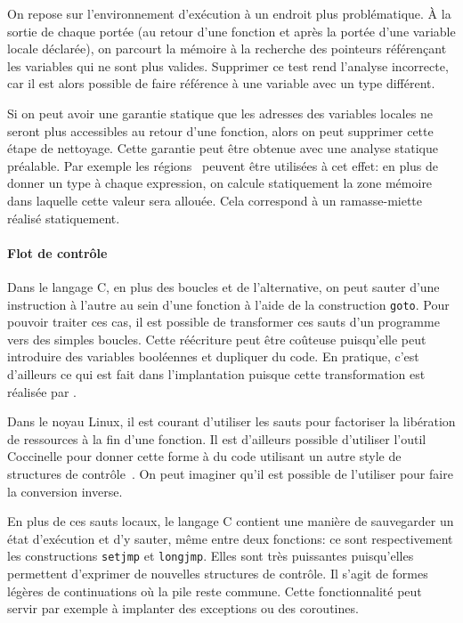 On repose sur l'environnement d'exécution à un endroit plus problématique. À la
sortie de chaque portée (au retour d'une fonction et après la portée d'une
variable locale déclarée), on parcourt la mémoire à la recherche des pointeurs
référençant les variables qui ne sont plus valides. Supprimer ce test rend
l'analyse incorrecte, car il est alors possible de faire référence à une
variable avec un type différent.

Si on peut avoir une garantie statique que les adresses des variables locales ne
seront plus accessibles au retour d'une fonction, alors on peut supprimer cette
étape de nettoyage. Cette garantie peut être obtenue avec une analyse statique
préalable. Par exemple les régions~\cite{jfp92} peuvent être utilisées à cet
effet: en plus de donner un type à chaque expression, on calcule
statiquement la zone mémoire dans laquelle cette valeur sera allouée. Cela
correspond à un ramasse-miette réalisé statiquement.


\paragraph{Flot de contrôle}

Dans le langage C, en plus des boucles et de l'alternative, on peut sauter d'une
instruction à l'autre au sein d'une fonction à l'aide de la construction
\texttt{goto}. Pour pouvoir traiter ces cas, il est possible de transformer ces
sauts d'un programme vers des simples boucles. Cette réécriture peut être
coûteuse puisqu'elle peut introduire des variables booléennes et dupliquer du
code. En pratique, c'est d'ailleurs ce qui est fait dans l'implantation puisque
cette transformation est réalisée par \ctonewspeak.

Dans le noyau Linux, il est courant d'utiliser les sauts pour factoriser la
libération de ressources à la fin d'une fonction. Il est d'ailleurs possible
d'utiliser l'outil Coccinelle pour donner cette forme à du code utilisant un
autre style de structures de contrôle~\cite{lctes11}. On peut imaginer qu'il est
possible de l'utiliser pour faire la conversion inverse.

En plus de ces sauts locaux, le langage C contient une manière de sauvegarder un
état d'exécution et d'y sauter, même entre deux fonctions: ce sont
respectivement les constructions \texttt{setjmp} et \texttt{longjmp}. Elles sont
très puissantes puisqu'elles permettent d'exprimer de nouvelles structures de
contrôle. Il s'agit de formes légères de continuations où la pile reste commune.
Cette fonctionnalité peut servir par exemple à implanter des exceptions ou des
coroutines.

